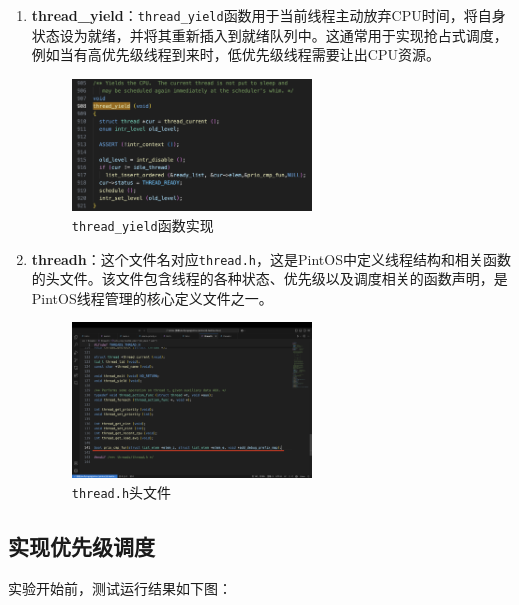 \documentclass{article}
\begin{document}
\begin{enumerate}
	\item \textbf{thread\_yield}：\texttt{thread\_yield}函数用于当前线程主动放弃CPU时间，将自身状态设为就绪，并将其重新插入到就绪队列中。这通常用于实现抢占式调度，例如当有高优先级线程到来时，低优先级线程需要让出CPU资源。
	
	\begin{figure}[H]
		\centering
		\includegraphics[width=0.6\textwidth]{img/thread_yield.png}
		\caption{\texttt{thread\_yield}函数实现}
	\end{figure}
	
	\item \textbf{threadh}：这个文件名对应\texttt{thread.h}，这是PintOS中定义线程结构和相关函数的头文件。该文件包含线程的各种状态、优先级以及调度相关的函数声明，是PintOS线程管理的核心定义文件之一。
	
	\begin{figure}[H]
		\centering
		\includegraphics[width=0.6\textwidth]{img/threadh.png}
		\caption{\texttt{thread.h}头文件}
	\end{figure}
\end{enumerate}

\subsection{实现优先级调度}

实验开始前，测试运行结果如下图：
\end{document}
